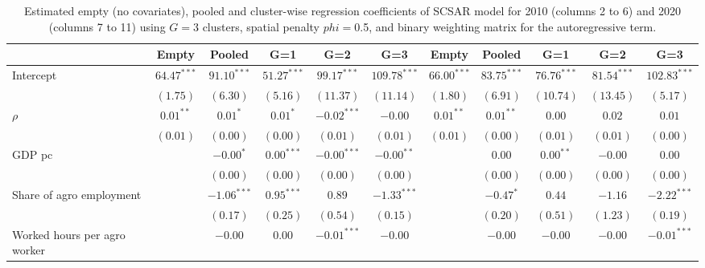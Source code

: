 
\begin{table}
\caption{Estimated empty (no covariates), pooled and cluster-wise regression coefficients of SCSAR model for 2010 (columns 2 to 6) and 2020 (columns 7 to 11) using $G=$3 clusters, spatial penalty $phi=$0.5, and binary weighting matrix for the autoregressive term.}
\begin{center}
\begin{tabular}{l c c c c c c c c c c}
\hline
 & Empty & Pooled & G=1 & G=2 & G=3 & Empty & Pooled & G=1 & G=2 & G=3 \\
\hline
Intercept                         & $64.47^{***}$ & $91.10^{***}$ & $51.27^{***}$ & $99.17^{***}$ & $109.78^{***}$ & $66.00^{***}$ & $83.75^{***}$ & $76.76^{***}$ & $81.54^{***}$ & $102.83^{***}$ \\
                                  & $(1.75)$      & $(6.30)$      & $(5.16)$      & $(11.37)$     & $(11.14)$      & $(1.80)$      & $(6.91)$      & $(10.74)$     & $(13.45)$     & $(5.17)$       \\
$\rho$                            & $0.01^{**}$   & $0.01^{*}$    & $0.01^{*}$    & $-0.02^{***}$ & $-0.00$        & $0.01^{**}$   & $0.01^{**}$   & $0.00$        & $0.02$        & $0.01$         \\
                                  & $(0.01)$      & $(0.00)$      & $(0.00)$      & $(0.01)$      & $(0.01)$       & $(0.01)$      & $(0.00)$      & $(0.01)$      & $(0.01)$      & $(0.00)$       \\
GDP pc                            &               & $-0.00^{*}$   & $0.00^{***}$  & $-0.00^{***}$ & $-0.00^{**}$   &               & $0.00$        & $0.00^{**}$   & $-0.00$       & $0.00$         \\
                                  &               & $(0.00)$      & $(0.00)$      & $(0.00)$      & $(0.00)$       &               & $(0.00)$      & $(0.00)$      & $(0.00)$      & $(0.00)$       \\
Share of agro employment          &               & $-1.06^{***}$ & $0.95^{***}$  & $0.89$        & $-1.33^{***}$  &               & $-0.47^{*}$   & $0.44$        & $-1.16$       & $-2.22^{***}$  \\
                                  &               & $(0.17)$      & $(0.25)$      & $(0.54)$      & $(0.15)$       &               & $(0.20)$      & $(0.51)$      & $(1.23)$      & $(0.19)$       \\
Worked hours per agro worker      &               & $-0.00$       & $0.00$        & $-0.01^{***}$ & $-0.00$        &               & $-0.00$       & $-0.00$       & $-0.00$       & $-0.01^{***}$  \\

\end{tabular}
\end{center}
\end{table}
